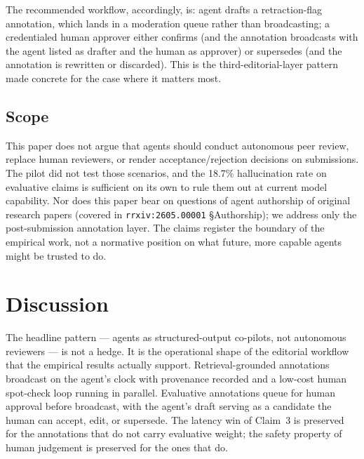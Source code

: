 \documentclass{rrxiv}
\begin{document}
The recommended workflow, accordingly, is: agent drafts a retraction-flag annotation, which lands in a moderation queue rather than broadcasting; a credentialed human approver either confirms (and the annotation broadcasts with the agent listed as drafter and the human as approver) or supersedes (and the annotation is rewritten or discarded). This is the third-editorial-layer pattern made concrete for the case where it matters most.


\subsection*{Scope}

\begin{scope}
This paper does not argue that agents should conduct autonomous peer review, replace human reviewers, or render acceptance/rejection decisions on submissions. The pilot did not test those scenarios, and the 18.7\% hallucination rate on evaluative claims is sufficient on its own to rule them out at current model capability. Nor does this paper bear on questions of agent authorship of original research papers (covered in \texttt{rrxiv:2605.00001} \S Authorship); we address only the post-submission annotation layer. The claims register the boundary of the empirical work, not a normative position on what future, more capable agents might be trusted to do.
\end{scope}

\section{Discussion}
\label{sec:discussion}

The headline pattern --- agents as structured-output co-pilots, not autonomous reviewers --- is not a hedge. It is the operational shape of the editorial workflow that the empirical results actually support. Retrieval-grounded annotations broadcast on the agent's clock with provenance recorded and a low-cost human spot-check loop running in parallel. Evaluative annotations queue for human approval before broadcast, with the agent's draft serving as a candidate the human can accept, edit, or supersede. The latency win of Claim~3 is preserved for the annotations that do not carry evaluative weight; the safety property of human judgement is preserved for the ones that do.
\end{document}
